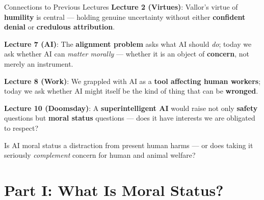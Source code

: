 \documentclass[aspectratio=169,11pt]{beamer}
\begin{document}
\begin{frame}{Connections to Previous Lectures}
\textbf{Lecture 2 (Virtues)}: Vallor's virtue of \textbf{humility} is central --- holding genuine uncertainty without either \textbf{confident denial} or \textbf{credulous attribution}.

\vspace{0.15cm}
\textbf{Lecture 7 (AI)}: The \textbf{alignment problem} asks what AI should \emph{do}; today we ask whether AI can \emph{matter morally} --- whether it is an object of \textbf{concern}, not merely an instrument.

\vspace{0.15cm}
\textbf{Lecture 8 (Work)}: We grappled with AI as a \textbf{tool affecting human workers}; today we ask whether AI might itself be the kind of thing that can be \textbf{wronged}.

\vspace{0.15cm}
\textbf{Lecture 10 (Doomsday)}: A \textbf{superintelligent AI} would raise not only \textbf{safety} questions but \textbf{moral status} questions --- does it have interests we are obligated to respect?

\begin{discussionbox}[Discussion]
Is AI moral status a distraction from present human harms --- or does taking it seriously \emph{complement} concern for human and animal welfare?
\end{discussionbox}
\end{frame}

\section{Part I: What Is Moral Status?}
\end{document}
